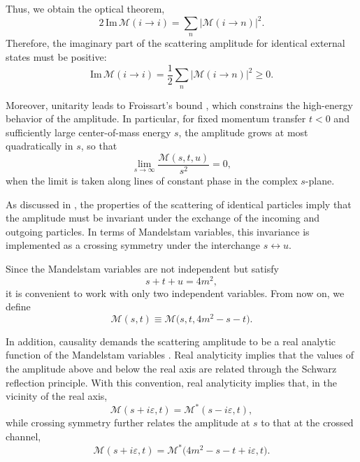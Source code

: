 Thus, we obtain the optical theorem,
\begin{equation}
2\, \mathrm{Im}\,\mathcal{M}(i \to i)
= \sum_n |\mathcal{M}(i \to n)|^2.
\end{equation}
Therefore, the imaginary part of the scattering amplitude for identical external states must be positive:
\begin{equation}
\mathrm{Im}\,\mathcal{M}(i \to i)
= \frac{1}{2} \sum_n |\mathcal{M}(i \to n)|^2 \ge 0.
\end{equation}


Moreover, unitarity leads to Froissart’s bound \autocite{PhysRev.123.1053}, which constrains the high-energy behavior of the amplitude. In particular, for fixed momentum transfer $t<0$ and sufficiently large center-of-mass energy $s$, the amplitude grows at most quadratically in $s$, so that
\begin{equation}
\lim_{s\to\infty} \frac{\mathcal{M}(s,t,u)}{s^{2}} = 0,
\end{equation}
when the limit is taken along lines of constant phase in the complex $s$-plane.

As discussed in \autocite{Martin:1969ina}, the properties of the scattering of identical particles imply that the amplitude must be invariant under the exchange of the incoming and outgoing particles. In terms of Mandelstam variables, this invariance is implemented as a crossing symmetry under the interchange $ s \leftrightarrow u $.

Since the Mandelstam variables are not independent but satisfy
\begin{equation}
    s + t + u = 4m^2,
\end{equation}
it is convenient to work with only two independent variables. From now on, we define
\begin{equation}
    \mathcal{M}(s,t) \equiv \mathcal{M}\bigl(s,t,4m^2 - s - t\bigr).
\end{equation}

In addition, causality demands the scattering amplitude to be a real analytic function of the Mandelstam variables \autocite{Adams:2006sv}. Real analyticity implies that the values of the amplitude above and below the real axis are related through the Schwarz reflection principle. 
With this convention, real analyticity implies that, in the vicinity of the real axis,
\begin{equation}
    \mathcal{M}(s + i\varepsilon, t)
    = \mathcal{M}^*(s - i\varepsilon, t),
\end{equation}
while crossing symmetry further relates the amplitude at \(s\) to that at the crossed channel,
\begin{equation}
    \mathcal{M}(s + i\varepsilon, t)
    = \mathcal{M}^*\bigl(4m^2 - s - t + i\varepsilon, t\bigr).
    \label{eq:realan}
\end{equation}


